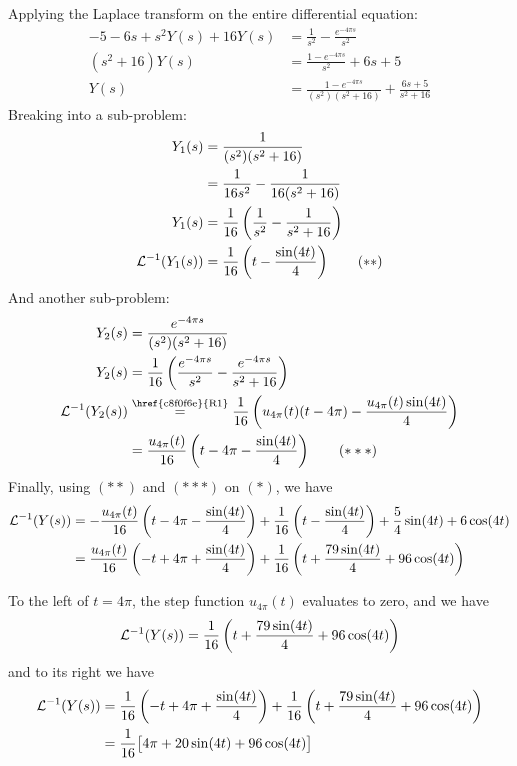 Applying the Laplace transform on the entire differential equation:
\begin{align}
	-5-6s+s^2Y(s)+16Y(s) & = \frac1{s^2}-\frac{e^{-4\pi s}}{s^2}                                 \\
	(s^2+16)Y(s)         & = \frac{1-e^{-4\pi s}}{s^2}+6s+5                                      \\
	Y(s)                 & = \frac{1-e^{-4\pi s}}{(s^2)(s^2+16)}+\frac{6s+5}{s^2+16}\tag*{($*$)}
\end{align}
Breaking into a sub-problem:
\begin{align}
	Y_1(s)      & =\frac1{(s^2)(s^2+16)}                                      \\
	            & =\frac{1}{16s^2}-\frac{1}{16(s^2+16)}                       \\
	Y_1(s)      & =\frac{1}{16}\left(\frac{1}{s^2}-\frac{1}{s^2+16}\right)    \\
	\mathcal L^{-1}(Y_1(s)) & =\frac{1}{16}\left(t-\frac{\sin(4t)}{4}\right)\tag*{($**$)}
\end{align}
And another sub-problem:
\begin{align}
	Y_2(s)      & =\frac{e^{-4\pi s}}{(s^2)(s^2+16)}                                                                                     \\
	Y_2(s)      & =\frac{1}{16}\left(\frac{e^{-4\pi s}}{s^2}-\frac{e^{-4\pi s}}{s^2+16}\right)                                           \\
	\LI(Y_2(s)) & \stackrel{\text{\href{c8f0f6e}{R1}}}{=}\frac{1}{16}\left(u_{4\pi}(t)(t-4\pi)-\frac{u_{4\pi}(t)\sin(4t)}{4}\right) \\
	            & =\frac{u_{4\pi}(t)}{16}\left(t-4\pi-\frac{\sin(4t)}{4}\right)\tag*{($***$)}
\end{align}
Finally, using $(**)$ and $(***)$ on $(*)$, we have
\begin{align}
	\mathcal L^{-1}(Y(s))
	 & = -\frac{u_{4\pi}(t)}{16}\left(t-4\pi-\frac{\sin(4t)}{4}\right)+
	\frac{1}{16}\left(t-\frac{\sin(4t)}{4}\right)+
	\frac54\sin(4t)+6\cos(4t)                                           \\
	 & = \frac{u_{4\pi}(t)}{16}\left(-t+4\pi+\frac{\sin(4t)}{4}\right)+
	\frac{1}{16}\left(t+\frac{79\sin(4t)}{4}+96\cos(4t)\right)
\end{align}

To the left of $t=4\pi$, the step function $u_{4\pi}(t)$ evaluates to
zero, and we have
$$
	\mathcal L^{-1}(Y(s))=\frac{1}{16}\left(t+\frac{79\sin(4t)}{4}+96\cos(4t)\right)
$$
and to its right we have
\begin{align}
	\mathcal L^{-1}(Y(s))
	 & = \frac{1}{16}\left(-t+4\pi+\frac{\sin(4t)}{4}\right)+
	\frac{1}{16}\left(t+\frac{79\sin(4t)}{4}+96\cos(4t)\right) \\
	 & =\frac{1}{16}\big[4\pi+20\sin(4t)+96\cos(4t)\big]       \\
\end{align}

